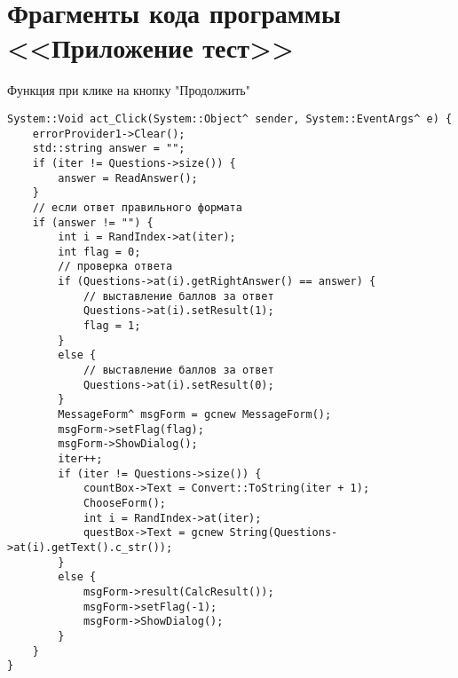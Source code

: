 \section{Фрагменты кода программы <<Приложение тест>>}
\label{app:test}

Функция при клике на кнопку "Продолжить"
\begin{verbatim}
System::Void act_Click(System::Object^ sender, System::EventArgs^ e) {
	errorProvider1->Clear();
	std::string answer = "";
	if (iter != Questions->size()) {
		answer = ReadAnswer();
	}
	// если ответ правильного формата
	if (answer != "") {
		int i = RandIndex->at(iter);
		int flag = 0;
		// проверка ответа
		if (Questions->at(i).getRightAnswer() == answer) {
			// выставление баллов за ответ
			Questions->at(i).setResult(1);
			flag = 1;
		}
		else {
			// выставление баллов за ответ
			Questions->at(i).setResult(0);
		}
		MessageForm^ msgForm = gcnew MessageForm();
		msgForm->setFlag(flag);
		msgForm->ShowDialog();
		iter++;
		if (iter != Questions->size()) {
			countBox->Text = Convert::ToString(iter + 1);
			ChooseForm();
			int i = RandIndex->at(iter);
			questBox->Text = gcnew String(Questions->at(i).getText().c_str());
		}
		else {
			msgForm->result(CalcResult());
			msgForm->setFlag(-1);
			msgForm->ShowDialog();
		}
	}
}
\end{verbatim}